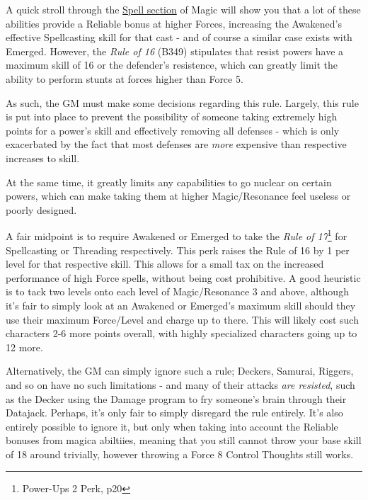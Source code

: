 \begin{multicols*}{3}
	A quick stroll through the \hyperref[spells]{Spell section} of Magic will show you that a lot of these abilities provide a Reliable bonus at higher Forces, increasing the Awakened's effective Spellcasting skill for that cast - and of course a similar case exists with Emerged. However, the \textit{Rule of 16} (B349) stipulates that resist powers have a maximum skill of 16 or the defender's resistence, which can greatly limit the ability to perform stunts at forces higher than Force 5.
	
	As such, the GM must make some decisions regarding this rule. Largely, this rule is put into place to prevent the possibility of someone taking extremely high points for a power's skill and effectively removing all defenses - which is only exacerbated by the fact that most defenses are \textit{more} expensive than respective increases to skill.
	
	At the same time, it greatly limits any capabilities to go nuclear on certain powers, which can make taking them at higher Magic/Resonance feel useless or poorly designed.
	
	A fair midpoint is to require Awakened or Emerged to take the \textit{Rule of 17}\footnote{Power-Ups 2 Perk, p20} for Spellcasting or Threading respectively. This perk raises the Rule of 16 by 1 per level for that respective skill. This allows for a small tax on the increased performance of high Force spells, without being cost prohibitive. A good heuristic is to tack two levels onto each level of Magic/Resonance 3 and above, although it's fair to simply look at an Awakened or Emerged's maximum skill should they use their maximum Force/Level and charge up to there. This will likely cost such characters 2-6 more points overall, with highly specialized characters going up to 12 more.
	
	Alternatively, the GM can simply ignore such a rule; Deckers, Samurai, Riggers, and so on have no such limitations - and many of their attacks \textit{are resisted}, such as the Decker using the Damage program to fry someone's brain through their Datajack. Perhaps, it's only fair to simply disregard the rule entirely. It's also entirely possible to ignore it, but only when taking into account the Reliable bonuses from magica abiltiies, meaning that you still cannot throw your base skill of 18 around trivially, however throwing a Force 8 Control Thoughts still works.
	
\end{multicols*}